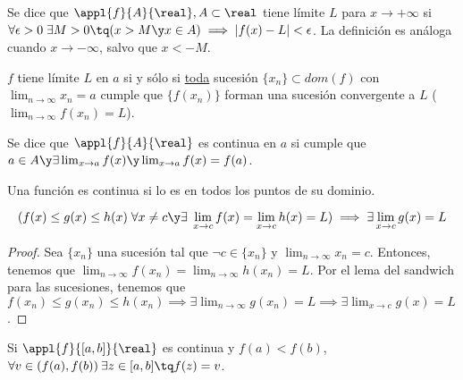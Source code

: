 \documentclass[palatino, nochap]{apuntes}
\begin{document}
\begin{defn} Se dice que $\appl{f}{A}{\real}, A\subset\real$ tiene límite $L$ para $x\to +\infty$ si $\forall \epsilon > 0\; \exists M >0 \tq (x>M\y x\in A)\implies |f(x)-L|<\epsilon$. La definición es análoga cuando $x\to -\infty$, salvo que $x<-M$.

\end{defn}

\begin{theorem}
$f$ tiene límite $L$ en $a$ si y sólo si \underline{toda} sucesión $\{x_n\}\subset dom(f)$ con $\lim_{n\to\infty} x_n=a$ cumple que $\{f(x_n)\}$ forman una sucesión convergente a $L$ ($\lim_{n\to\infty}f(x_n)=L$).
\end{theorem}

\begin{defn} Se dice que $\appl{f}{A}{\real}$ es continua en $a$ si cumple que $a\in A \y \exists \lim_{x\to a} f(x) \y \lim_{x\to a} f(x) = f(a)$.\end{defn}

\begin{defn} Una función es continua si lo es en todos los puntos de su dominio.\end{defn}

\begin{theorem}
\[(f(x) \leq g(x) \leq h(x) \; \forall x \neq c \y \exists \; \lim_{x\to c}f(x) =\lim_{x\to c}h(x)=L) \implies \exists \lim_{x\to c}g(x) = L\]
\end{theorem}

\begin{proof}
Sea $\{x_n\}$ una sucesión tal que $\neg c \in \{x_n\}$ y $\lim_{n\to\infty}x_n = c$. Entonces, tenemos que $\lim_{n\to\infty}f(x_n)=\lim_{n\to\infty}h(x_n)=L$. Por el lema del sandwich para las sucesiones, tenemos que $f(x_n)\leq g(x_n) \leq h(x_n) \implies \exists \lim_{n\to\infty}g(x_n)=L \implies \exists \lim_{x\to c}g(x) = L$.
\end{proof}

\begin{theorem}
Si $\appl{f}{[a,b]}{\real}$ es continua y $f(a)<f(b)$, $\forall v \in (f(a),f(b)) \:\exists z \in [a,b] \tq f(z)=v$.
\end{theorem}
\end{document}
